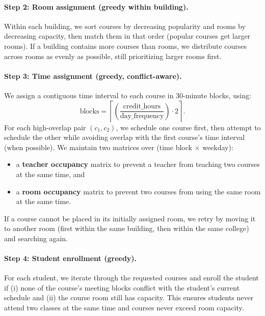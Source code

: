 \paragraph{Step 2: Room assignment (greedy within building).}
Within each building, we sort courses by decreasing popularity and rooms by decreasing capacity, then match them in that order (popular courses get larger rooms). If a building contains more courses than rooms, we distribute courses across rooms as evenly as possible, still prioritizing larger rooms first.

\paragraph{Step 3: Time assignment (greedy, conflict-aware).}
We assign a contiguous time interval to each course in 30-minute blocks, using:
\[
\text{blocks} = \left\lceil \left(\frac{\text{credit\_hours}}{\text{day\_frequency}}\right) \cdot 2 \right\rceil.
\]
For each high-overlap pair $(c_1,c_2)$, we schedule one course first, then attempt to schedule the other while avoiding overlap with the first course’s time interval (when possible). We maintain two matrices over (time block $\times$ weekday):
\begin{itemize}
  \item a \textbf{teacher occupancy} matrix to prevent a teacher from teaching two courses at the same time, and
  \item a \textbf{room occupancy} matrix to prevent two courses from using the same room at the same time.
\end{itemize}
If a course cannot be placed in its initially assigned room, we retry by moving it to another room (first within the same building, then within the same college) and searching again.

\paragraph{Step 4: Student enrollment (greedy).}
For each student, we iterate through the requested courses and enroll the student if (i) none of the course’s meeting blocks conflict with the student’s current schedule and (ii) the course room still has capacity. This ensures students never attend two classes at the same time and courses never exceed room capacity.

